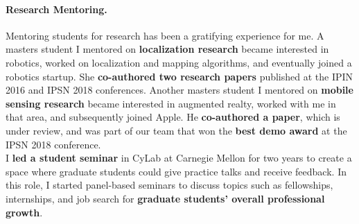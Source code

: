 \documentclass[10pt]{article}
\begin{document}


\paragraph{Research Mentoring. }
Mentoring students for research has been a gratifying experience for me. 
 A masters student I mentored on \textbf{localization research} became interested in robotics, worked on localization and mapping algorithms,  and eventually joined a robotics startup. She \textbf{co-authored two research papers} published at the IPIN 2016 and IPSN 2018 conferences.
Another masters student I mentored on \textbf{mobile sensing research} became interested in augmented realty, worked with me in that area, and subsequently joined Apple. He \textbf{co-authored a paper}, which is under review, and was part of our team that won the \textbf{best demo award} at the IPSN 2018 conference.\\ %

I \textbf{led a student seminar} in CyLab at Carnegie Mellon for two years to create a space where graduate students could give practice talks and receive feedback. In this role, I started panel-based seminars to discuss topics such as fellowships, internships, and job search for \textbf{graduate students' overall professional growth}. 
\end{document}
